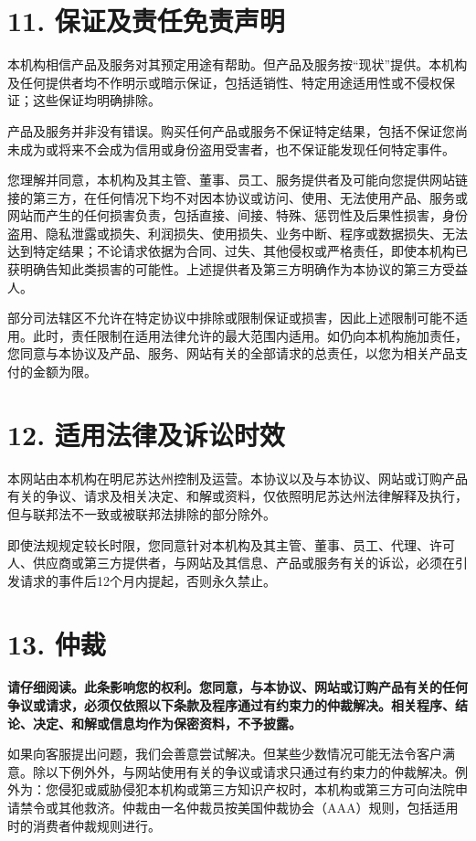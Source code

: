 \documentclass[UTF8,fontset=none,11pt,a4paper]{ctexart}
\begin{document}
\section*{11. 保证及责任免责声明}
本机构相信产品及服务对其预定用途有帮助。但产品及服务按“现状”提供。本机构及任何提供者均不作明示或暗示保证，包括适销性、特定用途适用性或不侵权保证；这些保证均明确排除。


产品及服务并非没有错误。购买任何产品或服务不保证特定结果，包括不保证您尚未成为或将来不会成为信用或身份盗用受害者，也不保证能发现任何特定事件。


您理解并同意，本机构及其主管、董事、员工、服务提供者及可能向您提供网站链接的第三方，在任何情况下均不对因本协议或访问、使用、无法使用产品、服务或网站而产生的任何损害负责，包括直接、间接、特殊、惩罚性及后果性损害，身份盗用、隐私泄露或损失、利润损失、使用损失、业务中断、程序或数据损失、无法达到特定结果；不论请求依据为合同、过失、其他侵权或严格责任，即使本机构已获明确告知此类损害的可能性。上述提供者及第三方明确作为本协议的第三方受益人。


部分司法辖区不允许在特定协议中排除或限制保证或损害，因此上述限制可能不适用。此时，责任限制在适用法律允许的最大范围内适用。如仍向本机构施加责任，您同意与本协议及产品、服务、网站有关的全部请求的总责任，以您为相关产品支付的金额为限。


\section*{12. 适用法律及诉讼时效}
本网站由本机构在明尼苏达州控制及运营。本协议以及与本协议、网站或订购产品有关的争议、请求及相关决定、和解或资料，仅依照明尼苏达州法律解释及执行，但与联邦法不一致或被联邦法排除的部分除外。


即使法规规定较长时限，您同意针对本机构及其主管、董事、员工、代理、许可人、供应商或第三方提供者，与网站及其信息、产品或服务有关的诉讼，必须在引发请求的事件后12个月内提起，否则永久禁止。


\section*{13. 仲裁}
\textbf{请仔细阅读。此条影响您的权利。您同意，与本协议、网站或订购产品有关的任何争议或请求，必须仅依照以下条款及程序通过有约束力的仲裁解决。相关程序、结论、决定、和解或信息均作为保密资料，不予披露。}


如果向客服提出问题，我们会善意尝试解决。但某些少数情况可能无法令客户满意。除以下例外外，与网站使用有关的争议或请求只通过有约束力的仲裁解决。例外为：您侵犯或威胁侵犯本机构或第三方知识产权时，本机构或第三方可向法院申请禁令或其他救济。仲裁由一名仲裁员按美国仲裁协会（AAA）规则，包括适用时的消费者仲裁规则进行。
\end{document}
